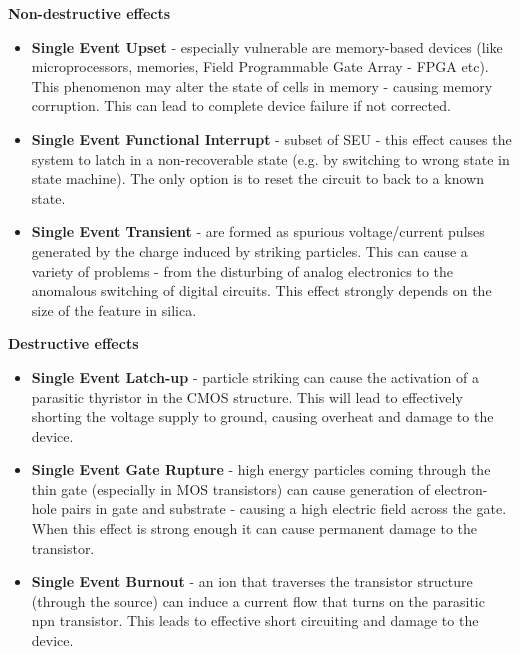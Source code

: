 \newpage
        \bigskip\textbf{Non-destructive effects}
        \begin{itemize}
            \item \textbf{Single Event Upset} - especially vulnerable are memory-based devices (like microprocessors, memories, Field Programmable Gate Array - FPGA etc). This phenomenon may alter the state of cells in memory - causing memory corruption. This can lead to complete device failure if not corrected.

            \item \textbf{Single Event Functional Interrupt} - subset of SEU - this effect causes the system to latch in a non-recoverable state (e.g. by switching to wrong state in state machine). The only option is to reset the circuit to back to a known state.

            \item \textbf{Single Event Transient} - are formed as spurious voltage/current pulses generated by the charge induced by striking particles. This can cause a variety of problems - from the disturbing of analog electronics to the anomalous switching of digital circuits. This effect strongly depends on the size of the feature in silica.
        \end{itemize}

        \bigskip\textbf{Destructive effects}
        \begin{itemize}
            \item \textbf{Single Event Latch-up} - particle striking can cause the activation of a parasitic thyristor in the CMOS structure. This will lead to effectively shorting the voltage supply to ground, causing overheat and damage to the device.

            \item \textbf{Single Event Gate Rupture} - high energy particles coming through the thin gate (especially in MOS transistors) can cause generation of electron-hole pairs in gate and substrate - causing a high electric field across the gate. When this effect is strong enough it can cause permanent damage to the transistor.

            \item \textbf{Single Event Burnout} - an ion that traverses the transistor structure (through the source) can induce a current flow that turns on the parasitic npn transistor. This leads to effective short circuiting and damage to the device.
        \end{itemize}


